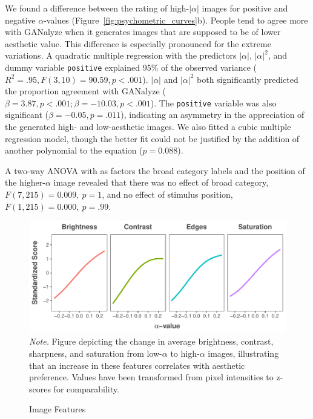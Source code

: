 \documentclass[../main.tex]{subfiles}
\begin{document}
We found a difference between the rating of high-$|\alpha|$ images for positive and negative $\alpha$-values (Figure~\ref{fig:psychometric_curves}b). People tend to agree more with GANalyze when it generates images that are supposed to be of lower aesthetic value. This difference is especially pronounced for the extreme variations. A quadratic multiple regression with the predictors $|\alpha|$, $|\alpha|^2$, and dummy variable \texttt{positive} explained 95\% of the observed variance ($R^2=.95, F(3,10)=90.59, p<.001$). $|\alpha|$ and $|\alpha|^2$ both significantly predicted the proportion agreement with GANalyze ($\beta=3.87, p<.001; \beta=-10.03, p<.001$). The \texttt{positive} variable was also significant ($\beta=-0.05, p=.011$), indicating an asymmetry in the appreciation of the generated high- and low-aesthetic images. We also fitted a cubic multiple regression model, though the better fit could not be justified by the addition of another polynomial to the equation ($p=0.088$).

A two-way ANOVA with as factors the broad category labels and the position of the higher-$\alpha$ image revealed that there was no effect of broad category, $F(7,215)=0.009, \ p=1$, and no effect of stimulus position, $F(1,215)=0.000, \ p=.99$.

\begin{figure}[!t]
	\caption{Image Features}
	\label{fig:img_features}
	\includegraphics[width=1\linewidth]{images/results/img_features.pdf}
	{\textit{Note.} Figure depicting the change in average brightness, contrast, sharpness, and saturation from low-$\alpha$ to high-$\alpha$ images, illustrating that an increase in these features correlates with aesthetic preference. Values have been transformed from pixel intensities to z-scores for comparability.}
\end{figure}
\end{document}

